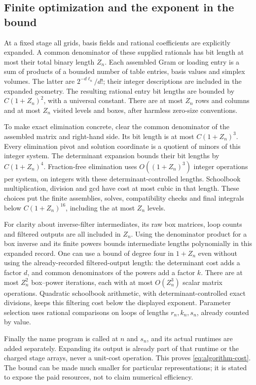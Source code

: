 \documentclass[11pt,a4paper]{article}
\numberwithin{equation}{section}
\theoremstyle{definition}
\theoremstyle{remark}\newtheorem{remark}[theorem]{Remark}
\begin{document}
\subsection{Finite optimization and the exponent in the bound}

At a fixed stage all grids, basis fields and rational coefficients
are explicitly expanded. A common denominator of these supplied
rationals has bit length at most their total binary length \(Z_n\).
Each assembled Gram or loading entry is a sum of products of a
bounded number of table entries, basis values and simplex volumes.
The latter are \(2^{-d\ell_n}/d!\); their integer descriptions are
included in the expanded geometry. The resulting rational entry
bit lengths are bounded by \(C(1+Z_n)^2\), with a universal constant.
There are at most \(Z_n\) rows and columns and at most \(Z_n\)
visited levels and boxes, after harmless zero-size conventions.

To make exact elimination concrete, clear the common denominator
of the assembled matrix and right-hand side. Its bit length is
at most \(C(1+Z_n)^3\).
Every elimination pivot and solution coordinate is a quotient of
minors of this integer system. The determinant expansion bounds
their bit lengths by \(C(1+Z_n)^4\).
Fraction-free elimination uses \(O((1+Z_n)^3)\) integer operations
per system, on integers with these determinant-controlled lengths.
Schoolbook multiplication, division and gcd have cost at most
cubic in that length. These choices put the finite assemblies,
solves, compatibility checks and final integrals below
\(C(1+Z_n)^{16}\), including the at most \(Z_n\) levels.

For clarity about inverse-filter intermediates, its raw box matrices,
loop counts and filtered outputs are all included in \(Z_n\).
Using the denominator product for a box inverse and its finite powers
bounds intermediate lengths polynomially in this expanded record.
One can use a bound of degree four in \(1+Z_n\) even without
using the already-recorded filtered-output length: the determinant
cost adds a factor \(d\), and common denominators of the powers
add a factor \(k\). There are at most \(Z_n^2\) box--power iterations,
each with at most \(O(Z_n^3)\) scalar matrix operations.
Quadratic schoolbook arithmetic, with determinant-controlled exact
divisions, keeps this filtering cost below the displayed exponent.
Parameter selection uses rational comparisons on loops of lengths
\(r_n,k_n,s_n\), already counted by value.

Finally the name program is called at \(n\) and \(s_n\), and its
actual runtimes are added separately. Expanding its output is already
part of that runtime or the charged stage arrays, never a unit-cost
operation. This proves \eqref{eq:algorithm-cost}. The bound can be
made much smaller for particular representations; it is stated to
expose the paid resources, not to claim numerical efficiency.
\end{document}
